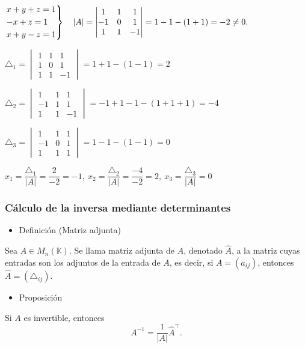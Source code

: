 \Ej

$\begin{rcases}
	x+y+z=1\\
	-x+z=1\\
	x+y-z=1
\end{rcases}\quad|A|=\begin{vmatrix}
1 & 1 & 1 \\
-1 & 0 & 1 \\
1 & 1 & -1
\end{vmatrix}=1-1-(1+1)=-2\neq0.$

$\triangle_1=\begin{vmatrix}
	1 & 1 & 1 \\
	1 & 0 & 1 \\
	1 & 1 & -1
\end{vmatrix}=1+1-(1-1)=2$

$\triangle_2=\begin{vmatrix}
	1 & 1 & 1 \\
	-1 & 1 & 1 \\
	1 & 1 & -1
\end{vmatrix}=-1+1-1-(1+1+1)=-4$

$\triangle_3=\begin{vmatrix}
	1 & 1 & 1 \\
	-1 & 0 & 1 \\
	1 & 1 & 1
\end{vmatrix}=1-1-(1-1)=0$

$x_1=\dfrac{\triangle_1}{|A|}=\dfrac{2}{-2}=-1,\: x_2=\dfrac{\triangle_2}{|A|}=\dfrac{-4}{-2}=2,\: x_3=\dfrac{\triangle_3}{|A|}=0$
\subsubsection{Cálculo de la inversa mediante determinantes}
\begin{itemize}[label=\color{red}\textbullet, leftmargin=*]
	\item \color{lightblue}Definición (Matriz adjunta)
\end{itemize}
Sea $A\in M_n(\mathbb{K})$. Se llama matriz adjunta de $A$, denotado $\hat{A}$, a la matriz cuyas entradas son los adjuntos de la entrada de $A$, es decir, si $A=(a_{ij})$, entonces $\hat{A}=(\triangle_{ij})$.
\begin{itemize}[label=\color{red}\textbullet, leftmargin=*]
	\item \color{lightblue}Proposición
\end{itemize}
Si $A$ es invertible, entonces \[ A^{-1}=\dfrac{1}{|A|}\hat{A}^\intercal . \]
\Ej

